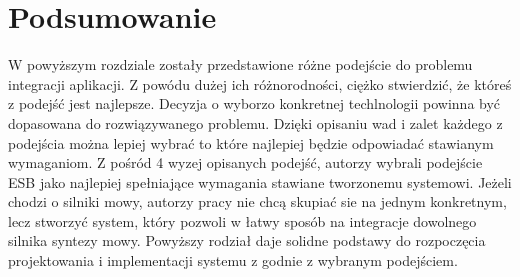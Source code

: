\newpage
\section*{Podsumowanie}
W powyższym rozdziale zostały przedstawione różne podejście do problemu integracji aplikacji. Z powódu dużej ich różnorodności, ciężko stwierdzić, że któreś z podejść jest najlepsze. Decyzja o wyborzo konkretnej techlnologii powinna być dopasowana do rozwiązywanego problemu. Dzięki opisaniu wad i zalet każdego z podejścia można lepiej wybrać to które najlepiej będzie odpowiadać stawianym wymaganiom. Z pośród 4 wyzej opisanych podejść, autorzy wybrali podejście ESB jako najlepiej spełniające wymagania stawiane tworzonemu systemowi. Jeżeli chodzi o silniki mowy, autorzy pracy nie chcą skupiać sie na jednym  konkretnym, lecz stworzyć system, który pozwoli w łatwy sposób na integracje dowolnego silnika syntezy mowy. Powyższy rodział daje solidne podstawy do rozpoczęcia projektowania i implementacji systemu z godnie z wybranym podejściem.





















